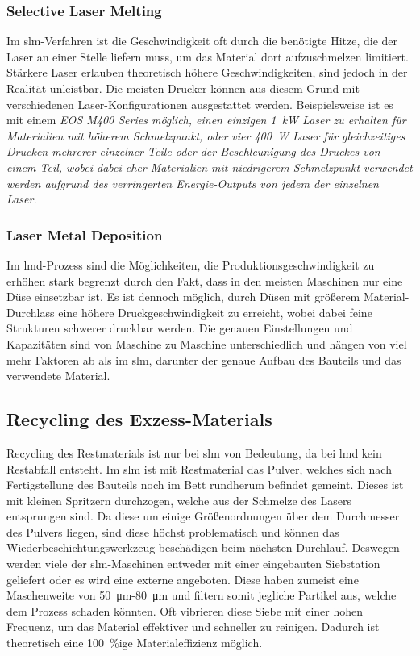 \documentclass[../main.tex]{subfiles}
\begin{document}
\subsubsection*{Selective Laser Melting}
Im \acrshort{slm}-Verfahren ist die Geschwindigkeit oft durch die benötigte Hitze, die der Laser an einer Stelle liefern muss, um das Material dort aufzuschmelzen limitiert. Stärkere Laser erlauben theoretisch höhere Geschwindigkeiten, sind jedoch in der Realität unleistbar. Die meisten Drucker können aus diesem Grund mit verschiedenen Laser-Konfigurationen ausgestattet werden. Beispielsweise ist es mit einem \it{EOS M400 Series} möglich, einen einzigen \qty{1}{\kilo\watt} Laser zu erhalten für Materialien mit höherem Schmelzpunkt, oder vier \qty{400}{\watt} Laser für gleichzeitiges Drucken mehrerer einzelner Teile oder der Beschleunigung des Druckes von einem Teil, wobei dabei eher Materialien mit niedrigerem Schmelzpunkt verwendet werden aufgrund des verringerten Energie-Outputs von jedem der einzelnen Laser.\parencite{eosm400,eosm400_4}
\subsubsection*{Laser Metal Deposition}
Im \acrlong{lmd}-Prozess sind die Möglichkeiten, die Produktionsgeschwindigkeit zu erhöhen stark begrenzt durch den Fakt, dass in den meisten Maschinen nur eine Düse einsetzbar ist. Es ist dennoch möglich, durch Düsen mit größerem Material-Durchlass eine höhere Druckgeschwindigkeit zu erreicht, wobei dabei feine Strukturen schwerer druckbar werden. Die genauen Einstellungen und Kapazitäten sind von Maschine zu Maschine unterschiedlich und hängen von viel mehr Faktoren ab als im \acrlong{slm}, darunter der genaue Aufbau des Bauteils und das verwendete Material. \parencite{Mahamood2017}
\subsection{Recycling des Exzess-Materials}
Recycling des Restmaterials ist nur bei \acrshort{slm} von Bedeutung, da bei \acrshort{lmd} kein Restabfall entsteht. Im \acrshort{slm} ist mit Restmaterial das Pulver, welches sich nach Fertigstellung des Bauteils noch im Bett rundherum befindet gemeint. Dieses ist mit kleinen Spritzern durchzogen, welche aus der Schmelze des Lasers entsprungen sind. Da diese um einige Größenordnungen über dem Durchmesser des Pulvers liegen, sind diese höchst problematisch und können das Wiederbeschichtungswerkzeug beschädigen beim nächsten Durchlauf. Deswegen werden viele der \acrshort{slm}-Maschinen entweder mit einer eingebauten Siebstation geliefert oder es wird eine externe angeboten. Diese haben zumeist eine Maschenweite von \qty{50}{\micro\meter}-\qty{80}{\micro\meter} und filtern somit jegliche Partikel aus, welche dem Prozess schaden könnten. Oft vibrieren diese Siebe mit einer hohen Frequenz, um das Material effektiver und schneller zu reinigen. Dadurch ist theoretisch eine \qty{100}{\percent}ige Materialeffizienz möglich. 
\end{document}
